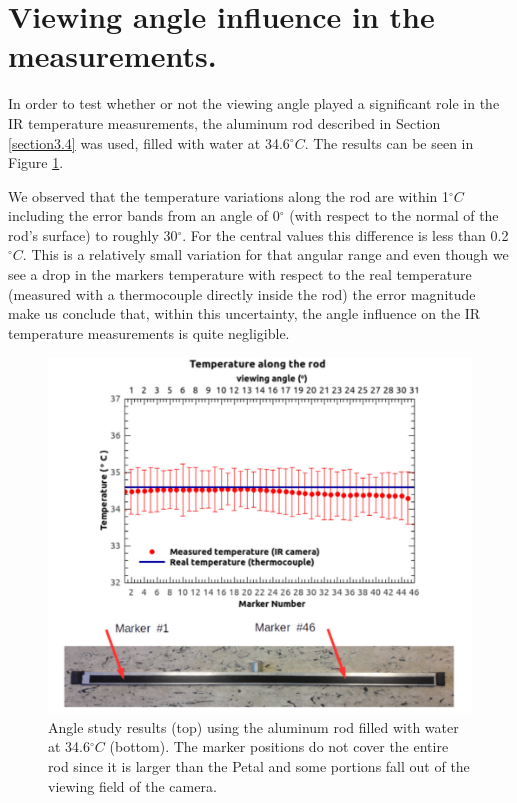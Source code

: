 	\section{Viewing angle influence in the measurements.}\label{section4.5}
	
		In order to test whether or not the viewing angle played a significant role in the IR temperature measurements, the aluminum rod described in Section \ref{section3.4} was used, filled with water at 34.6\space$^\circ C$. The results can be seen in Figure \ref{fig4.8}. 
		
		We observed that the temperature variations along the rod are within 1\space$^\circ C$ including the error bands from an angle of 0$^\circ$ (with respect to the normal of the rod’s surface) to roughly 30$^\circ$. For the central values this difference is less than 0.2\space$^\circ C$. This is a relatively small variation for that angular range and even though we see a drop in the markers temperature with respect to the real temperature (measured with a thermocouple directly inside the rod) the error magnitude make us conclude that, within this uncertainty, the angle influence on the IR temperature measurements is quite negligible.
		
		\begin{figure}[ht!]
			\centering
			\captionsetup{justification=centering,margin=0cm}
			\includegraphics[scale=0.4]{Figures/Chapter04/RodAngularTempResults.jpg}
			\caption{Angle study results (top) using the aluminum rod filled with water at 34.6\space$^\circ C$ (bottom). The marker positions do not cover the entire rod since it is larger than the Petal and some portions fall out of the viewing field of the camera.}\label{fig4.8}
		\end{figure}
	
	